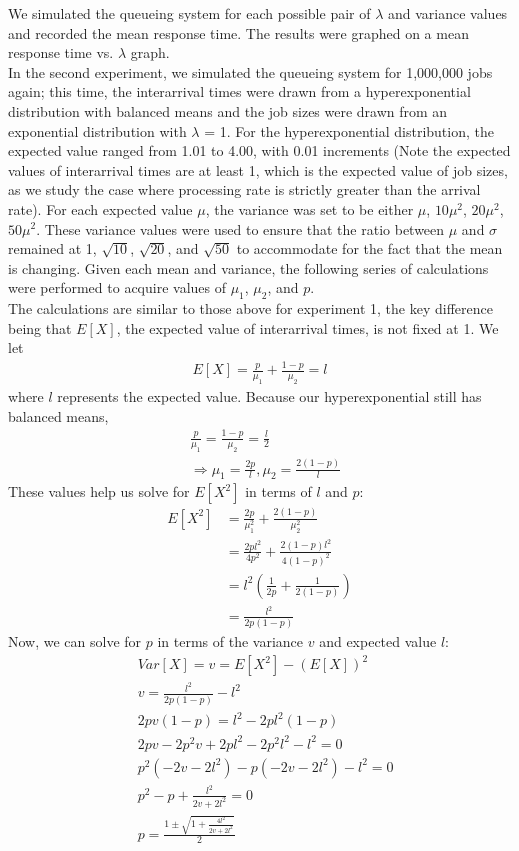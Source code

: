 \documentclass[12pt]{article}
\begin{document}
We simulated the queueing system for each possible pair of $\lambda$ and variance values and recorded the mean response time. The results were graphed on a mean response time vs. $\lambda$ graph. \\

In the second experiment, we simulated the queueing system for 1,000,000 jobs again; this time, the interarrival times were drawn from a hyperexponential distribution with balanced means and the job sizes were drawn from an exponential distribution with $\lambda$ = 1. For the hyperexponential distribution, the expected value ranged from 1.01 to 4.00, with 0.01 increments (Note the expected values of interarrival times are at least 1, which is the expected value of job sizes, as we study the case where processing rate is strictly greater than the arrival rate). For each expected value $\mu$, the variance was set to be either $\mu$, $10\mu^2$, $20\mu^2$, $50\mu^2$. These variance values were used to ensure that the ratio between $\mu$ and $\sigma$ remained at 1, $\sqrt{10}$, $\sqrt{20}$, and $\sqrt{50}$ to accommodate for the fact that the mean is changing. Given each mean and variance, the following series of calculations were performed to acquire values of $\mu_1$, $\mu_2$, and $p$. \\

The calculations are similar to those above for experiment 1, the key difference being that $E[X]$, the expected value of interarrival times, is not fixed at 1. We let
\begin{align*}
E[X] = \frac{p}{\mu_1} + \frac{1-p}{\mu_2} = l
\end{align*}
where $l$ represents the expected value. Because our hyperexponential still has balanced means, 
\begin{align*}
&\frac{p}{\mu_1} = \frac{1-p}{\mu_2} = \frac{l}{2} \\
&\Rightarrow \mu_1 = \frac{2p}{l}, \mu_2 = \frac{2(1-p)}{l}
\end{align*}
These values help us solve for $E[X^2]$ in terms of $l$ and $p$: 
\begin{align*}
E[X^2] &= \frac{2p}{\mu_1^2} + \frac{2(1-p)}{\mu_2^2} \\
&= \frac{2pl^2}{4p^2} + \frac{2(1-p)l^2}{4(1-p)^2} \\ 
&= l^2(\frac{1}{2p} + \frac{1}{2(1-p)}) \\
&= \frac{l^2}{2p(1-p)}
\end{align*}
Now, we can solve for $p$ in terms of the variance $v$ and expected value $l$: 
\begin{align*}
&Var[X] = v = E[X^2] - (E[X])^2 \\
&v = \frac{l^2}{2p(1-p)} - l^2 \\
&2pv(1-p) = l^2 - 2pl^2(1-p) \\ 
&2pv - 2p^2v + 2pl^2 - 2p^2l^2 - l^2 = 0 \\ 
&p^2(-2v - 2l^2) - p(-2v - 2l^2) - l^2 = 0 \\ 
&p^2 - p + \frac{l^2}{2v + 2l^2} = 0 \\ 
&p = \frac{1 \pm \sqrt{1 + \frac{4l^2}{2v + 2l^2}}}{2}
\end{align*}
\end{document}
